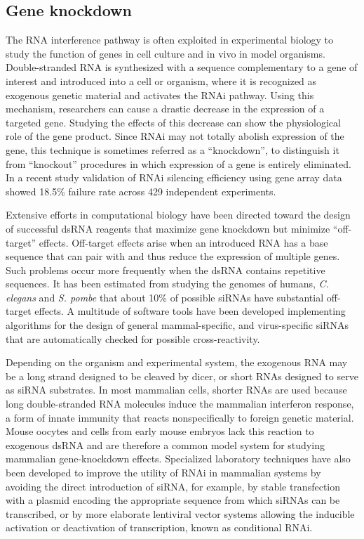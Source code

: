 \hypertarget{gene-knockdown}{%
\subsection{Gene knockdown}\label{gene-knockdown}}

The RNA interference pathway is often exploited in experimental biology to study the function of genes in cell culture and in vivo in model organisms. Double-stranded RNA is synthesized with a sequence complementary to a gene of interest and introduced into a cell or organism, where it is recognized as exogenous genetic material and activates the RNAi pathway. Using this mechanism, researchers can cause a drastic decrease in the expression of a targeted gene. Studying the effects of this decrease can show the physiological role of the gene product. Since RNAi may not totally abolish expression of the gene, this technique is sometimes referred as a ``knockdown'', to distinguish it from ``knockout'' procedures in which expression of a gene is entirely eliminated. In a recent study validation of RNAi silencing efficiency using gene array data showed 18.5\% failure rate across 429 independent experiments.

Extensive efforts in computational biology have been directed toward the design of successful dsRNA reagents that maximize gene knockdown but minimize ``off-target'' effects. Off-target effects arise when an introduced RNA has a base sequence that can pair with and thus reduce the expression of multiple genes. Such problems occur more frequently when the dsRNA contains repetitive sequences. It has been estimated from studying the genomes of humans, \emph{C. elegans} and \emph{S. pombe} that about 10\% of possible siRNAs have substantial off-target effects. A multitude of software tools have been developed implementing algorithms for the design of general mammal-specific, and virus-specific siRNAs that are automatically checked for possible cross-reactivity.

Depending on the organism and experimental system, the exogenous RNA may be a long strand designed to be cleaved by dicer, or short RNAs designed to serve as siRNA substrates. In most mammalian cells, shorter RNAs are used because long double-stranded RNA molecules induce the mammalian interferon response, a form of innate immunity that reacts nonspecifically to foreign genetic material. Mouse oocytes and cells from early mouse embryos lack this reaction to exogenous dsRNA and are therefore a common model system for studying mammalian gene-knockdown effects. Specialized laboratory techniques have also been developed to improve the utility of RNAi in mammalian systems by avoiding the direct introduction of siRNA, for example, by stable transfection with a plasmid encoding the appropriate sequence from which siRNAs can be transcribed, or by more elaborate lentiviral vector systems allowing the inducible activation or deactivation of transcription, known as conditional RNAi.

